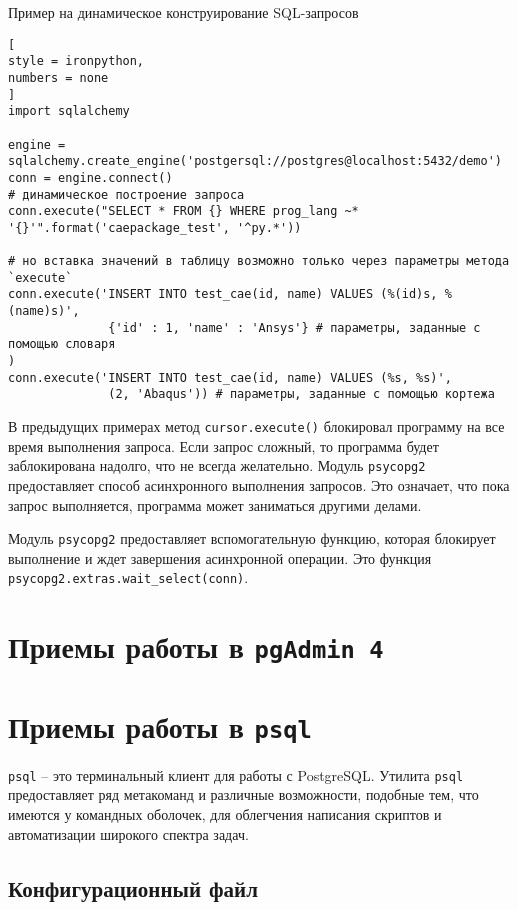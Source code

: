 \documentclass[%
	11pt,
	a4paper,
	utf8,
		]{article}
\begin{document}
Пример на динамическое конструирование SQL-запросов
\begin{lstlisting}[
style = ironpython,
numbers = none
]
import sqlalchemy

engine = sqlalchemy.create_engine('postgersql://postgres@localhost:5432/demo')
conn = engine.connect()
# динамическое построение запроса
conn.execute("SELECT * FROM {} WHERE prog_lang ~* '{}'".format('caepackage_test', '^py.*'))

# но вставка значений в таблицу возможно только через параметры метода `execute`
conn.execute('INSERT INTO test_cae(id, name) VALUES (%(id)s, %(name)s)',
              {'id' : 1, 'name' : 'Ansys'} # параметры, заданные с помощью словаря
)
conn.execute('INSERT INTO test_cae(id, name) VALUES (%s, %s)',
              (2, 'Abaqus')) # параметры, заданные с помощью кортежа
\end{lstlisting}

В предыдущих примерах метод \verb|cursor.execute()| блокировал программу на все время выполнения запроса. Если запрос сложный, то программа будет заблокирована надолго, что не всегда желательно. Модуль \texttt{psycopg2} предоставляет способ асинхронного выполнения запросов. Это означает, что пока запрос выполняется, программа может заниматься другими делами.

Модуль \texttt{psycopg2} предоставляет вспомогательную функцию, которая блокирует выполнение и ждет завершения асинхронной операции. Это функция \texttt{psycopg2.extras.wait\_select(conn)}.


\section{Приемы работы в \texttt{pgAdmin 4}}

\section{Приемы работы в \texttt{psql}}

\texttt{psql} -- это терминальный клиент для работы с PostgreSQL. Утилита \texttt{psql} предоставляет ряд метакоманд и различные возможности, подобные тем, что имеются у командных оболочек, для облегчения написания скриптов и автоматизации широкого спектра задач.

\subsection{Конфигурационный файл}
\end{document}
